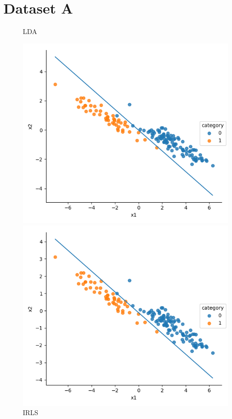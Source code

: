 \documentclass[a4paper]{article}
\begin{document}
\section{Dataset A}
\begin{figure}[h]
\centering
\begin{minipage}{0,45\textwidth}
\caption{LDA}
\includegraphics[scale=.4]{a_lda.png}
\end{minipage}
\begin{minipage}{0,45\textwidth}
\caption{IRLS}
\includegraphics[scale=.4]{a_irls.png}

\end{minipage}
\end{figure}
\end{document}

